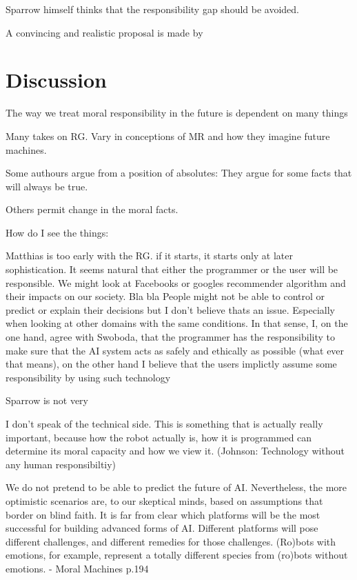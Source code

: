 \documentclass{article}
\newcounter{example}
\begin{document}
\newpage
Sparrow himself thinks that the responsibility gap should be avoided.

A convincing and realistic proposal is made by 

\section{Discussion}

The way we treat moral responsibility in the future is dependent on many things

Many takes on RG. Vary in conceptions of MR and how they imagine future
machines. 

Some authours argue from a position of absolutes: They argue for some facts that
will always be true.

Others permit change in the moral facts.

How do I see the things:

Matthias is too early with the RG. if it starts, it starts only at later
sophistication. It seems natural that either the programmer or the user will be
responsible. We might look at Facebooks or googles recommender algorithm and
their impacts on our society. Bla bla
People might not be able to control or predict or explain their decisions but I
don't believe thats an issue. Especially when looking at other domains with the
same conditions. In that sense, I, on the one hand, agree with Swoboda, that the
programmer has the responsibility to make sure that the AI system acts as safely
and ethically as possible (what ever that means), on the other hand I believe
that the users implictly assume some responsibility by using such technology

Sparrow is not very

I don't speak of the technical side. This is something that is actually really
important, because how the robot actually is, how it is programmed can determine
its moral capacity and how we view it. (Johnson: Technology without any human
responsibiltiy)


We do not pretend to be able to predict the future of AI. Nevertheless, the 
more optimistic scenarios are, to our skeptical minds, based on assumptions 
that border on blind faith. It is far from clear which platforms will be the most 
successful for building advanced forms of AI. Different platforms will pose 
different challenges, and different remedies for those challenges. (Ro)bots 
with emotions, for example, represent a totally different species from (ro)bots 
without emotions. - Moral Machines p.194
\end{document}

